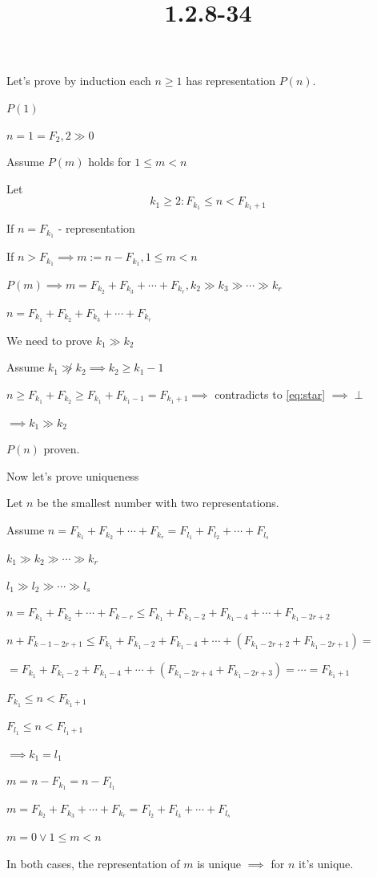 \documentclass{article}
\title{1.2.8-34}
\begin{document}
\maketitle

Let's prove by induction each $n \geq 1$ has representation $P(n)$.

$P(1)$

$n = 1 = F_2, 2 \gg 0$

Assume $P(m)$ holds for $1 \leq m < n$

Let
\[k_1 \geq 2: F_{k_1} \leq n < F_{k_1+1} \tag{*}\label{eq:star}\]

If $n = F_{k_1}$ - representation

If $n > F_{k_1} \implies m := n - F_{k_1}, 1 \leq m < n$

$P(m) \implies m = F_{k_2} + F_{k_3} + \cdots + F_{k_r}, k_2 \gg k_3 \gg \cdots \gg k_r$

$n = F_{k_1} + F_{k_2} + F_{k_3} + \cdots + F_{k_r}$

We need to prove $k_1 \gg k_2$

Assume $k_1 \not\gg k_2 \implies k_2 \geq k_1 - 1$

$n \geq F_{k_1} + F_{k_2} \geq F_{k_1} + F_{k_1-1} = F_{k_1 + 1} \implies$ contradicts to \eqref{eq:star} $\implies \perp$

$\implies k_1 \gg k_2$

$P(n)$ proven.

Now let's prove uniqueness

Let $n$ be the smallest number with two representations.

Assume $n = F_{k_1} + F_{k_2} + \cdots + F_{k_r} = F_{l_1} + F_{l_2} + \cdots + F_{l_s}$

$k_1 \gg k_2 \gg \cdots \gg k_r$

$l_1 \gg l_2 \gg \cdots \gg l_s$

$n = F_{k_1} + F_{k_2} + \cdots + F_{k-r} \leq F_{k_1} + F_{k_1 - 2} + F_{k_1 - 4} + \cdots + F_{k_1 - 2r + 2}$

$n + F_{k-1-2r+1} \leq F_{k_1} + F_{k_1 - 2} + F_{k_1 - 4} + \cdots + (F_{k_1 - 2r + 2} + F_{k_1 - 2r + 1}) =$

$= F_{k_1} + F_{k_1 - 2} + F_{k_1 - 4} + \cdots + (F_{k_1 - 2r + 4} + F_{k_1 - 2r + 3}) = \cdots = F_{k_1 + 1}$

$F_{k_1} \leq n < F_{k_1 + 1}$

$F_{l_1} \leq n < F_{l_1 + 1}$

$\implies k_1 = l_1$

$m = n - F_{k_1} = n - F_{l_1}$

$m = F_{k_2} + F_{k_3} + \cdots + F_{k_r} = F_{l_2} + F_{l_3} + \cdots + F_{l_s}$

$m = 0 \lor 1 \leq m < n$

In both cases, the representation of $m$ is unique $\implies$ for $n$ it's unique.
\end{document}
